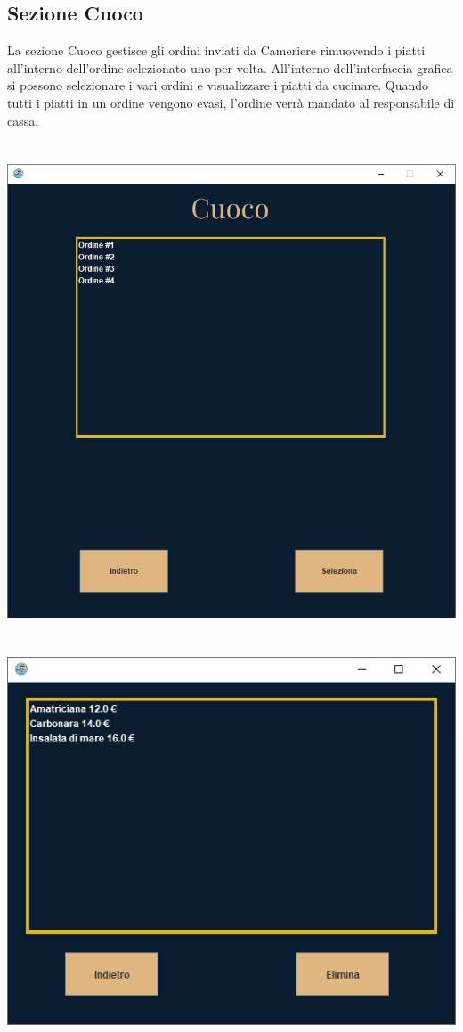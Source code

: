 \documentclass{article}
\begin{document}
    \subsection{Sezione Cuoco}
    La sezione Cuoco gestisce gli ordini inviati da Cameriere rimuovendo i piatti all'interno dell'ordine selezionato uno per volta. All'interno dell'interfaccia grafica si possono selezionare i vari ordini e visualizzare i piatti da cucinare. Quando tutti i piatti in un ordine vengono evasi, l'ordine verrà mandato al responsabile di cassa.
    \\\\\\
    \includegraphics[width=\textwidth]{Cuoco.png}
    \\\\\\
    \includegraphics[scale=0.9]{MetodoCuoco.png}
    \\\\\\
    
\end{document}
